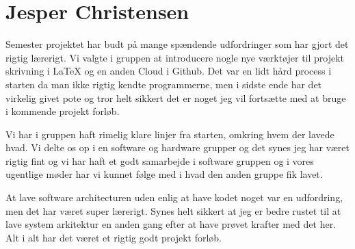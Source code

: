 \section{Jesper Christensen}

Semester projektet har budt på mange spændende udfordringer som har gjort det rigtig lærerigt. Vi valgte i gruppen at introducere nogle nye værktøjer til projekt skrivning i LaTeX og en anden Cloud i Github. Det var en lidt hård process i starten da man ikke rigtig kendte programmerne, men i sidste ende har det virkelig givet pote og tror helt sikkert det er noget jeg vil fortsætte med at bruge i kommende projekt forløb.

Vi har i gruppen haft rimelig klare linjer fra starten, omkring hvem der lavede hvad. Vi delte os op i en software og hardware grupper og det synes jeg har været rigtig fint og vi har haft et godt samarbejde i software gruppen og i vores ugentlige møder har vi kunnet følge med i hvad den anden gruppe fik lavet.

At lave software architecturen uden enlig at have kodet noget var en udfordring, men det har været super lærerigt. Synes helt sikkert at jeg er bedre rustet til at lave system arkitektur en anden gang efter at have prøvet krafter med det her. Alt i alt har det været et rigtig godt projekt forløb.